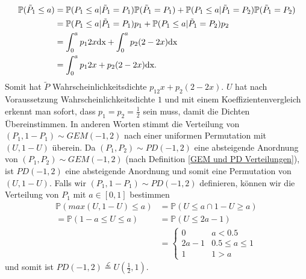 \begin{align*}
 \mathbb{P}(\tilde{P}_1 \leq a) &=  \mathbb{P}(P_1 \leq a| \tilde{P}_1 = P_1)\mathbb{P}(\tilde{P}_1 = P_1) + \mathbb{P}(P_1 \leq a| \tilde{P}_1 = P_2)\mathbb{P}(\tilde{P}_1 = P_2) \\
&= \mathbb{P}(P_1 \leq a| \tilde{P}_1 = P_1)p_1 + \mathbb{P}(P_1 \leq a| \tilde{P}_1 = P_2)p_2 \\
&= \int_{0}^{a}p_12x \textnormal{dx} + \int_{0}^{a}p_2(2-2x) \textnormal{dx}\\
&= \int_{0}^{a}p_12x + p_2(2-2x) \textnormal{dx}.
\end{align*}
Somit hat $\tilde{P}$ Wahrscheinlichkeitsdichte $p_12x + p_2(2-2x)$.
$U$ hat nach Voraussetzung Wahrscheinlichkeitsdichte $1$ und mit einem Koeffizientenvergleich erkennt man sofort, dass $p_1 = p_2 = \frac{1}{2}$ sein muss, damit die Dichten Übereinstimmen. In anderen Worten stimmt die Verteilung von $(P_1,1-P_1) \sim GEM(-1,2)$ nach einer uniformen Permutation mit $(U,1-U)$ überein. Da $(P_1,P_2) \sim PD(-1,2)$ eine  absteigende Anordnung von $(P_1,P_2) \sim GEM(-1,2)$ (nach Definition \ref{GEM und PD Verteilungen}), ist $PD(-1,2)$ eine absteigende Anordnung und somit eine Permutation von $(U,1-U)$. Falls wir $(P_1,1-P_1) \sim PD(-1,2)$ definieren, können wir die Verteilung von $P_1$ mit $a \in [0,1]$ bestimmen 
\begin{align*}
    \mathbb{P}(max(U,1-U) \leq a) &= \mathbb{P}(U \leq a \cap 1-U \geq a)\\
    = \mathbb{P}(1-a \leq U \leq a) &= \mathbb{P}(U \leq 2a - 1)\\
    &= \begin{cases}
        0 & a < 0.5 \\
      2a-1  & 0.5\leq a\leq 1\\
      1 & 1  > a 
    \end{cases}
\end{align*}
und somit ist $PD(-1,2) \stackrel{\mathcal{L}}{=} U(\frac{1}{2},1)$. \\

